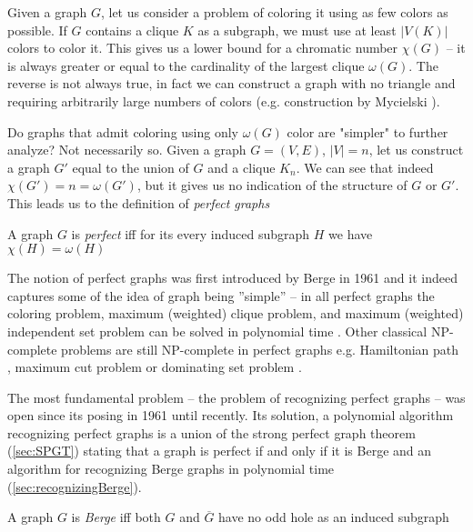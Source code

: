 Given a graph $G$, let us consider a problem of coloring it using as few colors as possible. If $G$ contains a clique $K$ as a subgraph, we must use at least $|V(K)|$ colors to color it. This gives us a lower bound for a chromatic number $\chi(G)$ -- it is always greater or equal to the cardinality of the largest clique $\omega(G)$. The reverse is not always true, in fact we can construct a graph with no triangle and requiring arbitrarily large numbers of colors (e.g. construction by Mycielski \cite{Mycielski1955}).

Do graphs that admit coloring using only $\omega(G)$ color are "simpler" to further analyze? Not necessarily so. Given a graph $G = (V, E)$, $|V| = n$, let us construct a graph $G'$ equal to the union of $G$ and a clique $K_n$. We can see that indeed $\chi(G') = n = \omega(G')$, but it gives us no indication of the structure of $G$ or $G'$. This leads us to the definition of \emph{perfect graphs}

\begin{defn}
	\label{def:perfectGraph}
	A graph $G$ is \emph{perfect} iff for its every induced subgraph $H$ we have $\chi(H) = \omega(H)$
\end{defn}

The notion of perfect graphs was first introduced by Berge in 1961 \cite{CB61} and it indeed captures some of the idea of graph being ''simple'' -- in all perfect graphs the coloring problem, maximum (weighted) clique problem, and maximum (weighted) independent set problem can be solved in polynomial time \cite{grotschel1993}. Other classical NP-complete problems are still NP-complete in perfect graphs e.g. Hamiltonian path \cite{Mller1996}, maximum cut problem \cite{Bodlaender1994} or dominating set problem \cite{Dewdney81}. 

The most fundamental problem -- the problem of recognizing perfect graphs -- was open since its posing in 1961 until recently. Its solution, a polynomial algorithm recognizing perfect graphs is a union of the strong perfect graph theorem (\cref{sec:SPGT}) stating that a graph is perfect if and only if it is Berge and an algorithm for recognizing Berge graphs in polynomial time (\cref{sec:recognizingBerge}).

\begin{defn}
	\label{def:bergeGraph}
	A graph $G$ is \emph{Berge} iff both $G$ and $\overline{G}$ have no odd hole as an induced subgraph
\end{defn}

